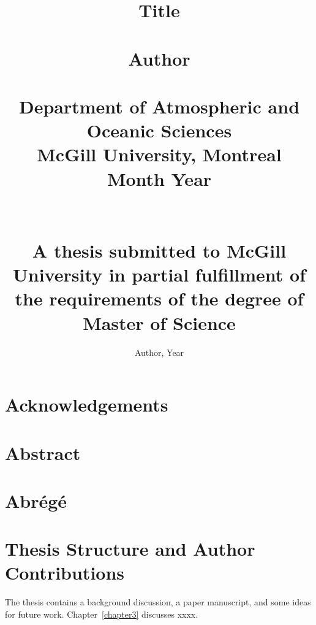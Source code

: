 \documentclass[12pt,fleqn]{graphicsclass}
\title{
{\textbf{Title}}\\~\\
{\large \textbf{Author}}\\~\\
{\large Department of Atmospheric and Oceanic Sciences \\ 
	McGill University, Montreal \\ 
	Month Year \\~\\~\\
	A thesis submitted to McGill University in partial fulfillment of the requirements of the degree of Master of Science }\\
}
\author{\textcopyright Author, Year}
\date{}
\begin{document}
\maketitle

\chapter*{Acknowledgements}
\label{sec:engack}

\chapter*{Abstract}
\label{sec:engAbstract}


\chapter*{Abrégé}
\label{sec:frAbstract}


\chapter*{Thesis Structure and Author Contributions}
The thesis contains a background discussion, a paper manuscript, and some ideas for future work. Chapter~\ref{chapter3} discusses xxxx. 

\label{sec:ded}


\tableofcontents
\listoffigures %
\listoftables
{}

\clearpage 
{} %








\end{document}
